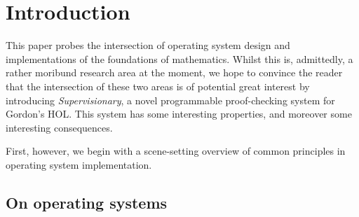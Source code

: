 \documentclass[a4paper, UKenglish, cleveref, autoref, thm-restate]{lipics-v2021}
\begin{document}
\section{Introduction}
\label{sect.introduction}

This paper probes the intersection of operating system design and implementations of the foundations of mathematics.
Whilst this is, admittedly, a rather moribund research area at the moment, we hope to convince the reader that the intersection of these two areas is of potential great interest by introducing \emph{Supervisionary}, a novel programmable proof-checking system for Gordon's HOL.
This system has some interesting properties, and moreover some interesting consequences.

First, however, we begin with a scene-setting overview of common principles in operating system implementation.

\subsection{On operating systems}
\end{document}
